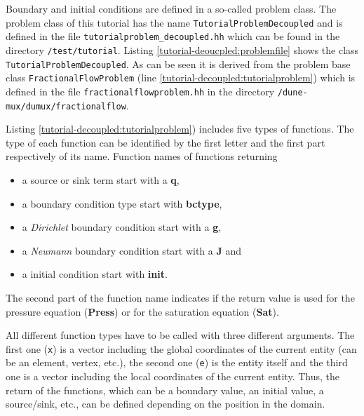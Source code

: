 Boundary and initial conditions are defined in a so-called problem class. The problem class of this tutorial has the name \texttt{TutorialProblemDecoupled} and is defined in the file \texttt{tutorialproblem\_decoupled.hh} which can be found in the directory \texttt{/test/tutorial}. Listing \ref{tutorial-deoucpled:problemfile} shows the class \texttt{TutorialProblemDecoupled}. As can be seen it is derived from the problem base class \texttt{FractionalFlowProblem} (line \ref{tutorial-decoupled:tutorialproblem}) which is defined in the file \texttt{fractionalflowproblem.hh} in the directory \texttt{/dune-mux/dumux/fractionalflow}. 

\begin{lst}\label{tutorial-deoucpled:problemfile} \mbox{}

\end{lst}

Listing \ref{tutorial-decoupled:tutorialproblem}) includes five types of functions. The type of each function can be identified by the first letter and the first part respectively of its name. Function names of functions returning
\begin{itemize}
 \item a source or sink term start with a \textbf{q},
 \item a boundary condition type start with \textbf{bctype},
 \item a \textit{Dirichlet} boundary condition start with a \textbf{g},
 \item a \textit{Neumann} boundary condition start with a \textbf{J} and
 \item a initial condition start with \textbf{init}. 
\end{itemize}
The second part of the function name indicates if the return value is used for the pressure equation (\textbf{Press}) or for the saturation equation (\textbf{Sat}).

All different function types have to be called with three different arguments. The first one (\texttt{x}) is a vector including the global coordinates of the current entity (can be an element, vertex, etc.), the second one (\texttt{e}) is the entity itself and the third one is a vector including the local coordinates of the current entity. Thus, the return of the functions, which can be a boundary value, an initial value, a source/sink, etc., can be defined depending on the position in the domain.

